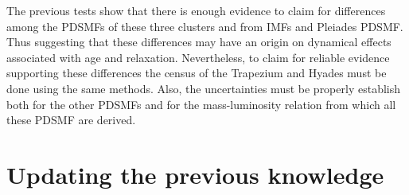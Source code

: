 The previous tests show that there is enough evidence to claim for differences among the PDSMFs of these three clusters and from IMFs and Pleiades PDSMF. Thus suggesting that these differences may have an origin on dynamical effects associated with age and relaxation. Nevertheless, to claim for reliable evidence supporting these differences the census of the Trapezium and Hyades must be done using the same methods. Also, the uncertainties must be properly establish both for the other PDSMFs and for the mass-luminosity relation from which all these PDSMF are derived. 

\section{Updating the previous knowledge}
